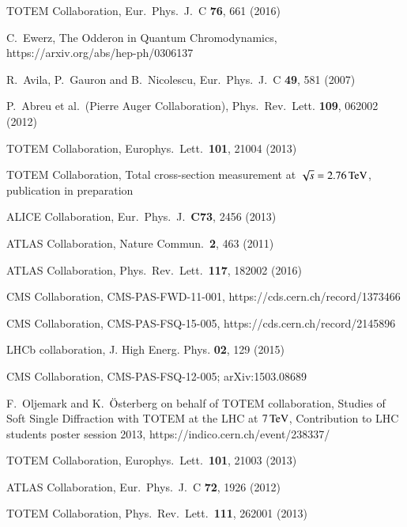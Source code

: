\documentclass{webofc}
\def\un#1{\,{\rm #1}}
\begin{document}
\begin{thebibliography}{99}
	TOTEM Collaboration, Eur.~Phys.~J.~C \textbf{76}, 661 (2016)

	C.~Ewerz, The Odderon in Quantum Chromodynamics, https://arxiv.org/abs/hep-ph/0306137

	R.~Avila, P.~Gauron and B.~Nicolescu, Eur.~Phys.~J.~C \textbf{49}, 581 (2007)

	P.~Abreu et al.~(Pierre Auger Collaboration), Phys.~Rev.~Lett. \textbf{109}, 062002 (2012)

	TOTEM Collaboration, Europhys.~Lett.~\textbf{101}, 21004 (2013)

	TOTEM Collaboration, Total cross-section measurement at $\sqrt s = 2.76\un{TeV}$, publication in preparation

	ALICE Collaboration, Eur.~Phys.~J.~\textbf{C73}, 2456 (2013)

	ATLAS Collaboration, Nature Commun.~\textbf{2}, 463 (2011)

	ATLAS Collaboration, Phys.~Rev.~Lett.~\textbf{117}, 182002 (2016)

	CMS Collaboration, CMS-PAS-FWD-11-001, https://cds.cern.ch/record/1373466

	CMS Collaboration, CMS-PAS-FSQ-15-005, https://cds.cern.ch/record/2145896

	LHCb collaboration, J. High Energ. Phys. \textbf{02}, 129 (2015)

	CMS Collaboration, CMS-PAS-FSQ-12-005; arXiv:1503.08689

	F.~Oljemark and K.~Österberg on behalf of TOTEM collaboration, Studies of Soft Single Diffraction with TOTEM at the LHC at $7\un{TeV}$, Contribution to LHC students poster session 2013, https://indico.cern.ch/event/238337/

	TOTEM Collaboration, Europhys.~Lett.~\textbf{101}, 21003 (2013)

	ATLAS Collaboration, Eur.~Phys.~J.~C \textbf{72}, 1926 (2012)

	TOTEM Collaboration, Phys.~Rev.~Lett.~\textbf{111}, 262001 (2013)



\end{thebibliography}
\end{document}

